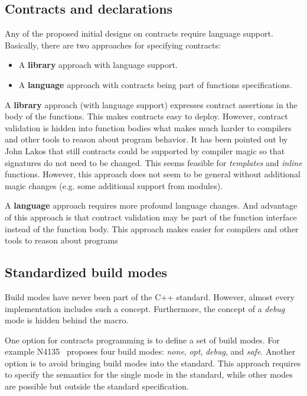 \subsection{Contracts and declarations}

Any of the proposed initial designs on contracts require language support.
Basically, there are two approaches for specifying contracts:

\begin{itemize}
\item A \textbf{library} approach with language support.
\item A \textbf{language} approach with contracts being part of functions
specifications.
\end{itemize}

A \textbf{library} approach (with language support) expresses contract
assertions in the body of the functions. This makes contracts easy to deploy.
However, contract validation is hidden into function bodies what makes much
harder to compilers and other tools to reason about program behavior. It has been
pointed out by John Lakos that still contracts could be supported by compiler magic
so that signatures do not need to be changed. This seems feasible for \emph{templates}
and \emph{inline} functions. However, this approach does not seem to be general
without additional magic changes (e.g. some additional support from modules).	

A \textbf{language} approach requires more profound language changes. And
advantage of this approach is that contract validation may be part of the
function interface instead of the function body. This approach makes easier for
compilers and other tools to reason about programs


\subsection{Standardized build modes}

Build modes have never been part of the C++ standard. However, almost every
implementation includes such a concept. Furthermore, the concept of a
\emph{debug} mode is hidden behind the  macro.

One option for contracts programming is to define a set of build modes. For
example N4135~\cite{n4135} proposes four build modes: \emph{none}, \emph{opt},
\emph{debug}, and \emph{safe}. Another option is to avoid bringing build modes
into the standard. This approach requires to specify the semantics for the
single mode in the standard, while other modes are possible but outside the
standard specification.

